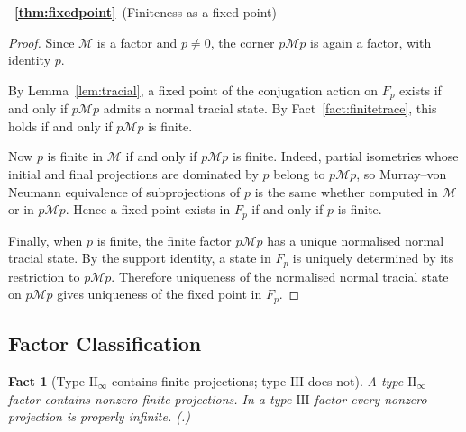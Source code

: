 \documentclass[11pt]{article}
\newtheorem{fact}[theorem]{Fact}
\begin{document}
~{\bf \ref{thm:fixedpoint}}~(Finiteness as a fixed point)
\begin{proof}
Since $\mathcal M$ is a factor and $p\ne0$, the corner
$p\mathcal Mp$ is again a factor, with identity $p$.

By Lemma~\ref{lem:tracial}, a fixed point of the conjugation action on
$F_p$ exists if and only if $p\mathcal Mp$ admits a normal tracial
state. By Fact~\ref{fact:finitetrace}, this holds if and only if
$p\mathcal Mp$ is finite.

Now $p$ is finite in $\mathcal M$ if and only if $p\mathcal Mp$ is
finite. Indeed, partial isometries whose initial and final projections
are dominated by $p$ belong to $p\mathcal Mp$, so Murray--von Neumann
equivalence of subprojections of $p$ is the same whether computed in
$\mathcal M$ or in $p\mathcal Mp$. Hence a fixed point exists in $F_p$
if and only if $p$ is finite.

Finally, when $p$ is finite, the finite factor $p\mathcal Mp$ has a
unique normalised normal tracial state. By the support identity, a
state in $F_p$ is uniquely determined by its restriction to
$p\mathcal Mp$. Therefore uniqueness of the normalised normal tracial
state on $p\mathcal Mp$ gives uniqueness of the fixed point in $F_p$.
\end{proof}

\subsection{Factor Classification}

\begin{fact}[Type $\mathrm{II}_\infty$ contains finite projections;
type $\mathrm{III}$ does not]
\label{fact:IIinfinity}
A type $\mathrm{II}_\infty$ factor contains nonzero finite projections.
In a type $\mathrm{III}$ factor every nonzero projection is properly
infinite. (\cite[Ch.~V, \S1]{Takesaki1}.)
\end{fact}
\end{document}
